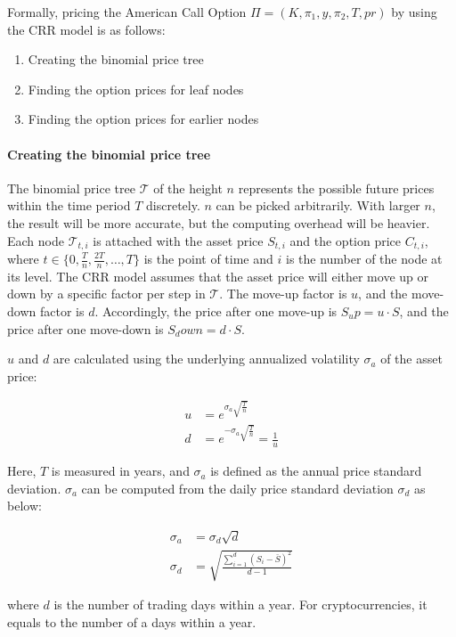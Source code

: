 Formally, pricing the American Call Option $\Pi = (K, \pi_1, y, \pi_2, T, pr)$ by using the CRR model is as follows:

\begin{enumerate}
    \item Creating the binomial price tree
    \item Finding the option prices for leaf nodes
    \item Finding the option prices for earlier nodes 
\end{enumerate}

\paragraph{Creating the binomial price tree}
The binomial price tree $\mathcal{T}$ of the height $n$ represents the possible future prices within the time period $T$ discretely.
$n$ can be picked arbitrarily. With larger $n$, the result will be more accurate, but the computing overhead will be heavier.
Each node $\mathcal{T}_{t, i}$ is attached with the asset price $S_{t, i}$ and the option price $C_{t, i}$,
where $t \in \{0, \frac{T}{n}, \frac{2T}{n}, \dots, T\}$ is the point of time and $i$ is the number of the node at its level.
The CRR model assumes that the asset price will either move up or down by a specific factor per step in $\mathcal{T}$.
The move-up factor is $u$, and the move-down factor is $d$.
Accordingly, the price after one move-up is $S_up = u \cdot S$, and the price after one move-down is $S_down = d \cdot S$.

$u$ and $d$ are calculated using the underlying annualized volatility $\sigma_a$ of the asset price:

\begin{align} 
u &= e^{\sigma_a \sqrt{\frac{T}{n}}}\\
d &= e^{- \sigma_a \sqrt{\frac{T}{n}}} = \frac{1}{u}
\end{align}

Here, $T$ is measured in years, and $\sigma_a$ is defined as the annual price standard deviation.
$\sigma_a$ can be computed from the daily price standard deviation $\sigma_d$ as below:

\begin{align} 
\sigma_a &= \sigma_d \sqrt{d}\\
\sigma_d &= \sqrt{\frac{\sum^{d}_{i=1} (S_i - \bar{S})^2}{d-1}}
\end{align}

where $d$ is the number of trading days within a year.
For cryptocurrencies, it equals to the number of a days within a year.

